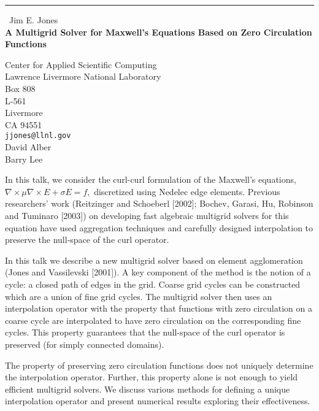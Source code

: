 \documentclass{report}
\begin{document}
\begin{center}
\rule{6in}{1pt} \
{\large Jim E. Jones \\
{\bf A Multigrid Solver for Maxwell's Equations Based on Zero Circulation Functions}}

Center for Applied Scientific Computing \\ Lawrence Livermore National Laboratory \\ Box 808 \\ L-561 \\ Livermore \\ CA 94551
\\
{\tt jjones@llnl.gov}\\
David Alber\\
Barry Lee\end{center}

In this talk, we consider the curl-curl formulation of the
Maxwell's equations,
$\nabla\times \mu \nabla\times E + \sigma E = f,$
discretized using Nedelec edge elements.
Previous researchers' work (Reitzinger and Schoeberl [2002];
Bochev, Garasi, Hu, Robinson and Tuminaro [2003]) on developing
fast algebraic multigrid
solvers for this equation have used aggregation techniques
and carefully designed interpolation to preserve the null-space
of the curl operator.

In this talk we describe a new multigrid solver based on
element agglomeration (Jones and Vassilevski [2001]).
A key component of the method is the notion of a cycle:
a closed path of edges in the grid. Coarse grid cycles can be constructed
which are a union of fine grid cycles. The multigrid
solver then uses an interpolation
operator with the property that functions with zero circulation
on a coarse cycle are interpolated to have zero circulation on
the corresponding fine cycles. This property guarantees that the
null-space of the curl operator is preserved (for simply
connected domains).

The property of preserving zero circulation functions
does not uniquely determine the interpolation operator.
Further, this property alone is not enough to yield efficient
multigrid solvers. We discuss various methods for defining a unique
interpolation operator and present numerical results exploring
their effectiveness.
\end{document}
